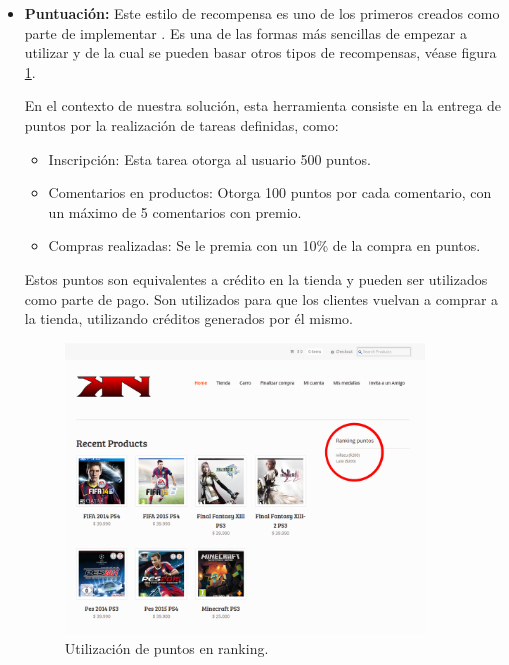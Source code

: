 \begin{itemize}
    \item {\bf Puntuación:}
	Este estilo de recompensa es uno de los primeros creados como parte de
	implementar {\gam}. Es una de las formas más sencillas de empezar
 	a utilizar {\gam}\cite{OnlineComp} y de la cual se pueden basar 
	otros tipos de recompensas,
	véase figura \ref{fig:ranking}.

        En el contexto de nuestra solución, esta herramienta consiste en la entrega de
	puntos por la realización de tareas definidas, como:

    \begin{itemize}
        \item Inscripción:
            Esta tarea otorga al usuario 500 puntos.
        \item Comentarios en productos:
            Otorga 100 puntos por cada comentario, con un máximo de 5 comentarios
            con premio.
        \item Compras realizadas:
            Se le premia con un 10\% de la compra en puntos.
    \end{itemize}

        Estos puntos son equivalentes a crédito en la tienda y pueden ser
        utilizados como parte de pago.
        Son utilizados para que los clientes vuelvan a comprar a la tienda,
        utilizando créditos generados por él mismo.

\begin{figure}[!htb]
  \centering
  \includegraphics[width=0.9\textwidth]{images/Tienda/Tienda_ranking.png}
  \caption[Ranking puntos]{Utilización de puntos en ranking.}
  \label{fig:ranking}
\end{figure}



\end{itemize}
